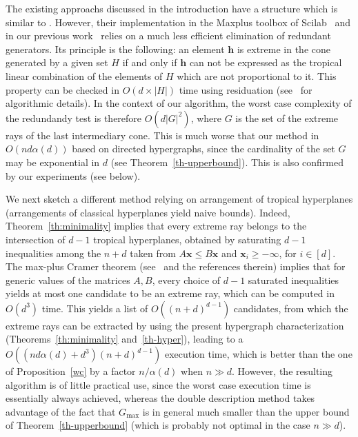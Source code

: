\documentclass[proceedings]{stacs}
\newcommand{\vect}[1]{\boldsymbol #1}
\newcommand{\card}[1]{\left\lvert #1 \right\rvert}
\begin{document}
The existing approachs discussed in the introduction have a structure which is similar to . However, their implementation in the Maxplus toolbox of {\sc Scilab}~\cite{toolbox} and in our previous work~\cite{AGG08} relies on a much less efficient elimination of redundant generators. Its principle is the following: an element $\vect{h}$ is extreme in the cone generated by a given set $H$ if and only if $\vect{h}$ can not be expressed as the tropical linear combination of the elements of $H$ which are not proportional to it. This property can be checked in $O(d \times \card{H})$ time using residuation (see~\cite{BSS} for algorithmic details). In the context of our algorithm, the worst case complexity of the redundandy test is therefore $O(d\card{G}^2)$, where $G$ is the set of the extreme rays of the last intermediary cone. This is much worse that our method in $O(n d \alpha(d))$ based on directed hypergraphs, since the cardinality of the set $G$ may be exponential in $d$ (see Theorem~\ref{th-upperbound}). This is also confirmed by our experiments (see below).







We next sketch a different method relying on arrangement of tropical
hyperplanes (arrangements of classical hyperplanes
yield naive bounds). Indeed, Theorem~\ref{th:minimality}
implies that every extreme ray belongs to the intersection
of $d-1$ tropical hyperplanes, 
obtained by saturating $d-1$ inequalities among the $n+d$ taken
from $A\vect{x}\leq B\vect{x}$ and $\vect{x}_i\geq -\infty$, for $i\in [d]$.
The max-plus Cramer theorem (see~\cite{AGG08b} and the references therein)
implies that for generic values of the matrices $A,B$, every choice of $d-1$
saturated inequalities yields at most one candidate to be
an extreme ray, which can be computed
in $O(d^3)$ time. This yields a list of $O((n+d)^{d-1})$ candidates,
from which the extreme rays can be extracted by using the present hypergraph characterization (Theorems~\ref{th:minimality} and~\ref{th-hyper}), leading
to a $O((nd\alpha(d)+d^3)(n+d)^{d-1})$ execution time, which is better than the one of Proposition~\ref{wc} by a factor $n/\alpha(d)$ when $n\gg d$.
However, the resulting algorithm is of little practical use, since 
the worst case execution time is essentially always achieved, whereas
the double description method takes advantage of the fact that $G_{\max}$
is in general much smaller than the upper bound of Theorem~\ref{th-upperbound}
(which is probably not optimal in the case $n\gg d$).
\end{document}
